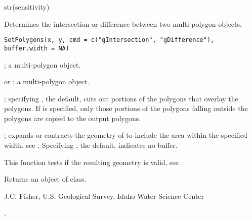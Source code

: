 \documentclass[a4paper]{book}
\begin{document}
%
\begin{Examples}
\begin{ExampleCode}
str(sensitivity)
\end{ExampleCode}
\end{Examples}
%
\begin{Description}\relax
Determines the intersection or difference between two multi-polygon objects.
\end{Description}
%
\begin{Usage}
\begin{verbatim}
SetPolygons(x, y, cmd = c("gIntersection", "gDifference"), buffer.width = NA)
\end{verbatim}
\end{Usage}
%
\begin{Arguments}
\begin{ldescription}
\item[\code{x}] ; a multi-polygon object.
\item[\code{y}]  or ; a multi-polygon object.
\item[\code{cmd}] ; specifying , the default, cuts out portions of the  polygons that overlay the  polygons.
If  is specified, only those portions of the  polygons falling outside the  polygons are copied to the output polygons.
\item[\code{buffer.width}] ; expands or contracts the geometry of  to include the area within the specified width, see .
Specifying , the default, indicates no buffer.
\end{ldescription}
\end{Arguments}
%
\begin{Details}\relax
This function tests if the resulting geometry is valid, see .
\end{Details}
%
\begin{Value}
Returns an object of  class.
\end{Value}
%
\begin{Author}\relax
J.C. Fisher, U.S. Geological Survey, Idaho Water Science Center
\end{Author}
%
\begin{SeeAlso}\relax
{}, 
\end{SeeAlso}
\end{document}
